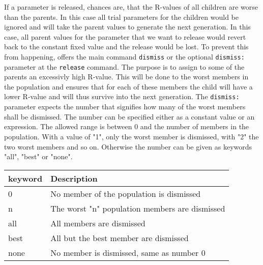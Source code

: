 If a parameter is released, chances are, that the R-values of all children
are worse than the parents. In this case all trial parameters for the children 
would be ignored and \Diffev will take the parent values to generate the
next generation. In this case, all parent values for the parameter that we want
to release would revert back to the constant fixed value and the release would
be lost. To prevent this from happening, \Diffev offers the main command
{\tt dismiss} or the optional {\tt dismiss:} parameter at the {\tt release} 
command. The purpose is to assign to some of the parents an excessivly high 
R-value. This will be done to the worst members in the population and ensures
that for each of these members the child will have a lower R-value and will 
thus survive into the next generation. The {\tt dismiss:} parameter expects 
the number that signifies how many of the worst members shall be dismissed.
The number can be specified either as a constant value or an expression.
The allowed range is between 0 and the number of members in the population. 
With a value of "1", only the worst member is dismissed, with "2" the two
worst members and so on.
Otherwise the number can be given as keywords "all", "best" or "none".

\begin{tabular}{lp{12cm}}
     keyword & {Description} \\
     \hline
     0 & {No member of the population is dismissed} \\
         \hline
     n & {The worst "n" population members are dismissed} \\
         \hline
     all & All members are dismissed \\
         \hline
     best & All but the best member are dismissed \\
         \hline
     none & No member is dismissed, same as number 0 \\
         \hline
\end{tabular}



